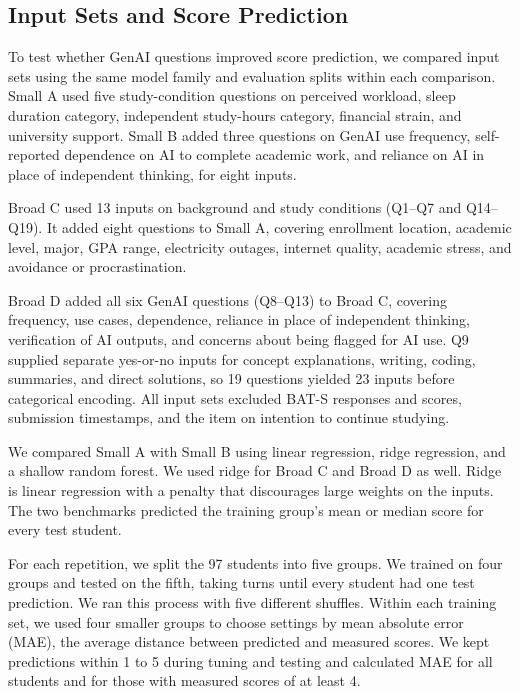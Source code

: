 \subsection{Input Sets and Score Prediction}

To test whether GenAI questions improved score prediction, we compared input sets using the same model family and evaluation splits within each comparison. Small A used five study-condition questions on perceived workload, sleep duration category, independent study-hours category, financial strain, and university support. Small B added three questions on GenAI use frequency, self-reported dependence on AI to complete academic work, and reliance on AI in place of independent thinking, for eight inputs.

Broad C used 13 inputs on background and study conditions (Q1--Q7 and Q14--Q19). It added eight questions to Small A, covering enrollment location, academic level, major, GPA range, electricity outages, internet quality, academic stress, and avoidance or procrastination.

Broad D added all six GenAI questions (Q8--Q13) to Broad C, covering frequency, use cases, dependence, reliance in place of independent thinking, verification of AI outputs, and concerns about being flagged for AI use. Q9 supplied separate yes-or-no inputs for concept explanations, writing, coding, summaries, and direct solutions, so 19 questions yielded 23 inputs before categorical encoding. All input sets excluded BAT-S responses and scores, submission timestamps, and the item on intention to continue studying.

We compared Small A with Small B using linear regression, ridge regression, and a shallow random forest. We used ridge for Broad C and Broad D as well. Ridge is linear regression with a penalty that discourages large weights on the inputs. The two benchmarks predicted the training group's mean or median score for every test student.

For each repetition, we split the 97 students into five groups. We trained on four groups and tested on the fifth, taking turns until every student had one test prediction. We ran this process with five different shuffles. Within each training set, we used four smaller groups to choose settings by mean absolute error (MAE), the average distance between predicted and measured scores. We kept predictions within 1 to 5 during tuning and testing and calculated MAE for all students and for those with measured scores of at least 4.

